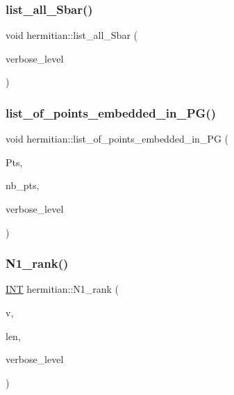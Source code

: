 \subsubsection{\texorpdfstring{list\+\_\+all\+\_\+\+Sbar()}{list\_all\_Sbar()}}
{\footnotesize\ttfamily void hermitian\+::list\+\_\+all\+\_\+\+Sbar (\begin{DoxyParamCaption}\item[{\mbox{\hyperlink{galois_8h_a09fddde158a3a20bd2dcadb609de11dc}{I\+NT}}}]{verbose\+\_\+level }\end{DoxyParamCaption})}

\mbox{\label{classhermitian_aeca5f1aa7d9a4672724e496948172a8e}} 
\subsubsection{\texorpdfstring{list\+\_\+of\+\_\+points\+\_\+embedded\+\_\+in\+\_\+\+P\+G()}{list\_of\_points\_embedded\_in\_PG()}}
{\footnotesize\ttfamily void hermitian\+::list\+\_\+of\+\_\+points\+\_\+embedded\+\_\+in\+\_\+\+PG (\begin{DoxyParamCaption}\item[{\mbox{\hyperlink{galois_8h_a09fddde158a3a20bd2dcadb609de11dc}{I\+NT}} $\ast$\&}]{Pts,  }\item[{\mbox{\hyperlink{galois_8h_a09fddde158a3a20bd2dcadb609de11dc}{I\+NT}} \&}]{nb\+\_\+pts,  }\item[{\mbox{\hyperlink{galois_8h_a09fddde158a3a20bd2dcadb609de11dc}{I\+NT}}}]{verbose\+\_\+level }\end{DoxyParamCaption})}

\mbox{\label{classhermitian_a334681066fd4e89ec0e3c672dde9ef7a}} 
\subsubsection{\texorpdfstring{N1\+\_\+rank()}{N1\_rank()}}
{\footnotesize\ttfamily \mbox{\hyperlink{galois_8h_a09fddde158a3a20bd2dcadb609de11dc}{I\+NT}} hermitian\+::\+N1\+\_\+rank (\begin{DoxyParamCaption}\item[{\mbox{\hyperlink{galois_8h_a09fddde158a3a20bd2dcadb609de11dc}{I\+NT}} $\ast$}]{v,  }\item[{\mbox{\hyperlink{galois_8h_a09fddde158a3a20bd2dcadb609de11dc}{I\+NT}}}]{len,  }\item[{\mbox{\hyperlink{galois_8h_a09fddde158a3a20bd2dcadb609de11dc}{I\+NT}}}]{verbose\+\_\+level }\end{DoxyParamCaption})}

